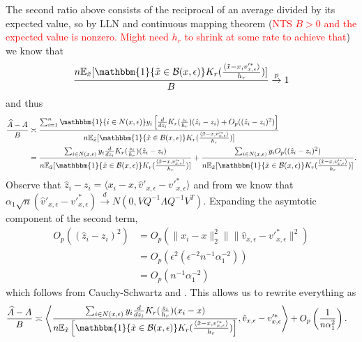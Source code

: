 \documentclass[11pt]{article}
\begin{document}
The second ratio above consists of the reciprocal of an average divided by its expected value, so by LLN and continuous mapping theorem (\textcolor{red}{NTS $B > 0$ and the expected value is nonzero. Might need $h_r$ to shrink at some rate to achieve that}) we know that 
\[\frac{n \mathbb{E}_{\tilde{x}}[\mathbbm{1}\{\tilde{x} \in \mathcal{B}(x, \epsilon)\}K_r(\frac{\langle \tilde{x} - x, v'^*_{x, \epsilon}\rangle}{h_r})]}{B} \overset{p}{\rightarrow }1\]
and thus
\begin{align*}
    \frac{\widehat{A} - A}{B} &\asymp \frac{\sum_{i = 1}^n \mathbbm{1}\{i \in N(x, \epsilon)\}y_i\left[\frac{d}{dz_i}K_r(\frac{z_i}{h_r})(\hat{z}_i - z_i) + O_p((\hat{z}_i - z_i)^2)\right]}{n \mathbb{E}_{\tilde{x}}[\mathbbm{1}\{\tilde{x} \in \mathcal{B}(x, \epsilon)\}K_r(\frac{\langle \tilde{x} - x, v'^*_{x, \epsilon}\rangle}{h_r})]} \\
    &= \frac{\sum_{i \in N(x, \epsilon)}y_i\frac{d}{dz_i}K_r(\frac{z_i}{h_r})(\hat{z}_i - z_i)}{n \mathbb{E}_{\tilde{x}}[\mathbbm{1}\{\tilde{x} \in \mathcal{B}(x, \epsilon)\}K_r(\frac{\langle \tilde{x} - x, v'^*_{x, \epsilon}\rangle}{h_r})]} + \frac{\sum_{i \in N(x, \epsilon)} y_iO_p((\hat{z}_i - z_i)^2)}{n \mathbb{E}_{\tilde{x}}[\mathbbm{1}\{\tilde{x} \in \mathcal{B}(x, \epsilon)\}K_r(\frac{\langle \tilde{x} - x, v'^*_{x, \epsilon}\rangle}{h_r})]}.
\end{align*}
Observe that $\hat{z}_i - z_i = \langle x_i - x, \hat{v}'_{x, \epsilon} - v'^*_{x, \epsilon}\rangle$ and from  we know that $\alpha_1\sqrt{n}(\hat{v}'_{x, \epsilon} - v'^*_{x, \epsilon}) \overset{d}{\rightarrow} N(0, VQ^{-1}\Lambda Q^{-1}V^T)$. Expanding the asymtotic component of the second term,
\begin{align*}
    O_p((\hat{z}_i - z_i)^2) &= O_p(\|x_i-x\|_2^2\|\|\hat{v}_{x, \epsilon} - v'^*_{x, \epsilon}\|^2) \\
    &= O_p(\epsilon^2(\epsilon^{-2}n^{-1}\alpha_1^{-2})) \\
    &= O_p(n^{-1}\alpha_1^{-2})
\end{align*}
which follows from Cauchy-Schwartz and . This allows us to rewrite everything as
\begin{align}
    \frac{\widehat{A} - A}{B} &\asymp \left\langle\frac{\sum_{i \in N(x, \epsilon)}y_i\frac{d}{dz_i}K_r(\frac{z_i}{h_r})(x_i - x)}{n \mathbb{E}_{\tilde{x}}\left[\mathbbm{1}\{\tilde{x} \in \mathcal{B}(x, \epsilon)\}K_r(\frac{\langle \tilde{x} - x, v'^*_{x, \epsilon}\rangle}{h_r})\right]} , \hat{v}_{x, \epsilon} - v'^*_{x, \epsilon}\right\rangle + O_p\left(\frac{1}{n\alpha_1^2}\right).
\end{align}
\end{document}
